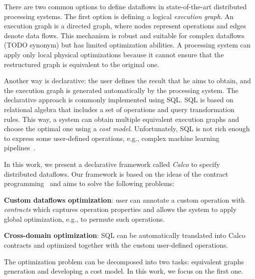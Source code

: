 There are two common options to define dataflows in state-of-the-art distributed processing systems.
The first option is defining a logical {\em execution graph}.
An execution graph is a directed graph, where nodes represent operations and edges denote data flows.
This mechanism is robust and suitable for complex dataflows (TODO synonym) but has limited optimization abilities.
A processing system can apply only local physical optimizations because it cannot ensure that the restructured graph is equivalent to the original one.

Another way is declarative: the user defines the result that he aims to obtain, and the execution graph is generated automatically by the processing system.
The declarative approach is commonly implemented using SQL.
SQL is based on relational algebra that includes a set of operations and query transformation rules.
This way, a system can obtain multiple equivalent execution graphs and choose the optimal one using a {\em cost model}.
Unfortunately, SQL is not rich enough to express some user-defined operations, e.g., complex machine learning pipelines~\cite{schule2019mlearn}.

In this work, we present a declarative framework called {\em Calco} to specify distributed dataflows.
Our framework is based on the ideas of the contract programming~\cite{meyer2002design} and aims to solve the following problems:

{\bf Custom dataflows optimization}: user can annotate a custom operation with {\em contracts} which captures operation properties and allows the system to apply global optimization, e.g., to permute such operations.

{\bf Cross-domain optimization}: SQL can be automatically translated into Calco contracts and optimized together with the custom user-defined operations.

The optimization problem can be decomposed into two tasks: equivalent graphs generation and developing a cost model.
In this work, we focus on the first one.
